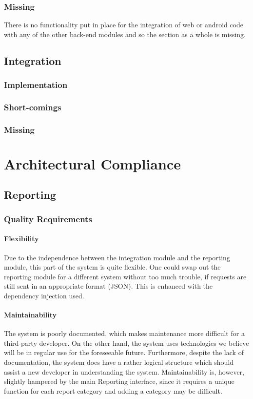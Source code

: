 \documentclass{article}
\begin{document}
        \subsubsection{Missing}
        There is no functionality put in place for the integration of web or android code with any of the other back-end modules and so the section as a whole is missing.

    \subsection{Integration}
		\subsubsection{Implementation}
		\subsubsection{Short-comings}
		\subsubsection{Missing}

\section{Architectural Compliance}
    \subsection{Reporting}
        \subsubsection{Quality Requirements}
            \paragraph{Flexibility}
            Due to the independence between the integration module and the reporting module, this part of the system is quite flexible. One could swap out the reporting module for a different system without too much trouble, if requests are still sent in an appropriate format (JSON). This is enhanced with the dependency injection used.
            \paragraph{Maintainability}
            The system is poorly documented, which makes maintenance more difficult for a third-party developer. On the other hand, the system uses technologies we believe will be in regular use for the foreseeable future. Furthermore, despite the lack of documentation, the system does have a rather logical structure which should assist a new developer in understanding the system. Maintainability is, however, slightly hampered by the main Reporting interface, since it requires a unique function for each report category and adding a category may be difficult.
\end{document}
